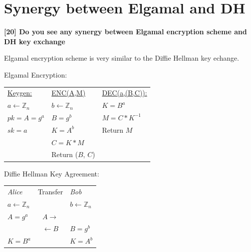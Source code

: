\documentclass[letterpaper,11pt,notitlepage,fleqn]{article}
\begin{document}
\section{Synergy between Elgamal and DH}
\noindent \textbf{[20] Do you see any synergy between Elgamal encryption scheme and DH key exchange}

Elgamal encryption scheme is very similar to the Diffie Hellman key echange. 

\noindent Elgamal Encryption: \\
\begin{tabular}{l l l}
    \underline{Keygen:} & \underline{ENC(A,M)} & \underline{DEC(a,(B,C)):} \\ 
    $a \leftarrow \mathbb{Z}_{n}$ & $b \leftarrow \mathbb{Z}_{n}$ & $K = B^a$ \\
    $pk = A = g^a$ & $B = g^b$ & $M = C \ast K^{-1}$ \\
    $sk = a$ & $K = A^b$ & Return $M$ \\
    & $C = K \ast M$ & \\
    & Return ($B$, $C$) &
    
\end{tabular}

\noindent Diffie Hellman Key Agreement: \\
\begin{tabular}{l c l}
    \textit{Alice} & Transfer & \textit{Bob} \\
    $a \leftarrow \mathbb{Z}_{n}$ & & $b \leftarrow \mathbb{Z}_{n}$ \\ 
    $A = g^a$ & $A \rightarrow$ & \\
    & $\leftarrow B$ & $ B = g^b $ \\
    $K = B^{a}$ & & $K = A^{b}$ \\
\end{tabular}
\end{document}
